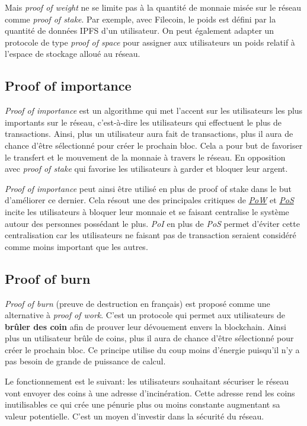 Mais \textit{proof of weight} ne se limite pas à la quantité de monnaie misée sur le réseau comme \textit{proof of stake}. Par exemple, avec Filecoin, le poids est défini par la quantité de données IPFS d'un utilisateur. On peut également adapter un protocole de type \textit{proof of space} pour assigner aux utilisateurs un poids relatif à l'espace de stockage alloué au réseau.

\subsection{Proof of importance}

\textit{Proof of importance} est un algorithme qui met l'accent sur les utilisateurs les plus importants sur le réseau, c'est-à-dire les utilisateurs qui effectuent le plus de transactions. Ainsi, plus un utilisateur aura fait de transactions, plus il aura de chance d'être sélectionné pour créer le prochain bloc. Cela a pour but de favoriser le transfert et le mouvement de la monnaie à travers le réseau. En opposition avec \textit{proof of stake} qui favorise les utilisateurs à garder et bloquer leur argent.

\textit{Proof of importance} peut ainsi être utilisé en plus de proof of stake dans le but d'améliorer ce dernier. Cela résout une des principales critiques de \hyperref[consensus:pow]{\textit{PoW}} et \hyperref[consensus:pos]{\textit{PoS}} incite les utilisateurs à bloquer leur monnaie et se faisant centralise le système autour des personnes possédant le plus. \textit{PoI} en plus de \textit{PoS} permet d'éviter cette centralisation car les utilisateurs ne faisant pas de transaction seraient considéré comme moins important que les autres.

\subsection{Proof of burn}

\textit{Proof of burn} (preuve de destruction en français) est proposé comme une alternative à \textit{proof of work}. C'est un protocole qui permet aux utilisateurs de \textbf{brûler des coin} afin de prouver leur dévouement envers la blockchain. Ainsi plus un utilisateur brûle de coins, plus il aura de chance d'être sélectionné pour créer le prochain bloc. Ce principe utilise du coup moins d'énergie puisqu'il n'y a pas besoin de grande de puissance de calcul.

Le fonctionnement est le suivant: les utilisateurs souhaitant sécuriser le réseau vont envoyer des coins à une adresse d'incinération. Cette adresse rend les coins inutilisables ce qui crée une pénurie plus ou moins constante augmentant sa valeur potentielle. C'est un moyen d'investir dans la sécurité du réseau.

